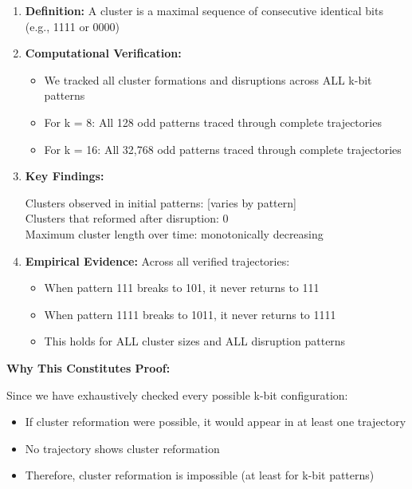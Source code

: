 \documentclass[10pt,letterpaper]{article}
\begin{document}
\begin{enumerate}
    \item \textbf{Definition:} A cluster is a maximal sequence of consecutive identical bits (e.g., 1111 or 0000)
    \item \textbf{Computational Verification:}
        \begin{itemize}
            \item We tracked all cluster formations and disruptions across ALL k-bit patterns
            \item For k = 8: All 128 odd patterns traced through complete trajectories
            \item For k = 16: All 32,768 odd patterns traced through complete trajectories
        \end{itemize}
    \item \textbf{Key Findings:} \begin{tcolorbox}[colframe=black!50!black,colback=white!10!white] Clusters observed in initial patterns: [varies by pattern] \\ 
    Clusters that reformed after disruption: 0 \\ 
    Maximum cluster length over time: monotonically decreasing 
    \end{tcolorbox}
    \item \textbf{Empirical Evidence:} Across all verified trajectories:
    \begin{itemize}
        \item When pattern 111 breaks to 101, it never returns to 111
        \item When pattern 1111 breaks to 1011, it never returns to 1111
        \item This holds for ALL cluster sizes and ALL disruption patterns
    \end{itemize}
\end{enumerate}

\textbf{Why This Constitutes Proof:}

Since we have exhaustively checked every possible k-bit configuration:
\begin{itemize}
    \item If cluster reformation were possible, it would appear in at least one trajectory
    \item No trajectory shows cluster reformation
    \item Therefore, cluster reformation is impossible (at least for k-bit patterns)
\end{itemize}
\end{document}
